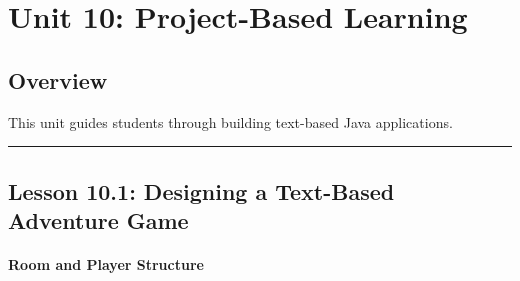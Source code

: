 \documentclass[
  justified,
  openright,
]{tufte-book}
\let\subsubsection\paragraph
\let\paragraph\paragraph
\let\subsubsection\paragraph
\let\paragraph\paragraph
\begin{document}
\section{Unit 10: Project-Based
Learning}\label{unit-10-project-based-learning}

\subsection{Overview}\label{overview-10}

This unit guides students through building text-based Java applications.

\begin{center}\rule{0.5\linewidth}{0.5pt}\end{center}

\subsection{Lesson 10.1: Designing a Text-Based Adventure
Game}\label{lesson-10.1-designing-a-text-based-adventure-game}

\subsubsection{Room and Player
Structure}\label{room-and-player-structure}
\end{document}
